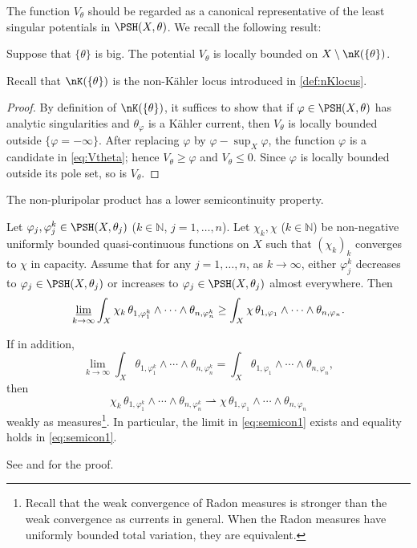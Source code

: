 The function $V_{\theta}$ should be regarded as a canonical representative of the least singular potentials in $\PSH(X,\theta)$. We recall the following result:

\begin{lemma}\label{lma:Vthetalocbdd}
    Suppose that $\{\theta\}$ is big.
    The potential $V_{\theta}$ is locally bounded on $X\setminus \nK(\{\theta\})$.
\end{lemma}
Recall that $\nK(\{\theta\})$ is the non-Kähler locus introduced in \cref{def:nKlocus}.
\begin{proof}
    By definition of $\nK(\{\theta\})$, it suffices to show that if $\varphi\in \PSH(X,\theta)$ has analytic singularities and $\theta_{\varphi}$ is a Kähler current, then $V_{\theta}$ is locally bounded outside $\{\varphi=-\infty\}$. After replacing $\varphi$ by $\varphi-\sup_X\varphi$, the function $\varphi$ is a candidate in \eqref{eq:Vtheta}; hence $V_{\theta}\geq \varphi$ and $V_{\theta}\leq 0$. Since $\varphi$ is locally bounded outside its pole set, so is $V_{\theta}$.
\end{proof}


The non-pluripolar product has a lower semicontinuity property.
\begin{theorem}\label{thm:semicon}
    Let $\varphi_j, \varphi_j^k\in \PSH(X,\theta_j)$ ($k\in \mathbb{N}$, $j=1,\ldots,n$).
    Let $\chi_k,\chi$ ($k\in \mathbb{N}$) be non-negative uniformly bounded quasi-continuous functions on $X$ such that $(\chi_k)_k$ converges to $\chi$ in capacity.
    Assume that for any $j=1,\ldots,n$, as $k\to\infty$, either $\varphi_j^k$ decreases to $\varphi_j\in \PSH(X,\theta_j)$ or increases to $\varphi_j\in \PSH(X,\theta_j)$ almost everywhere.
    Then
    \begin{equation}\label{eq:semicon1}
    \varliminf_{k\to\infty}\int_X\chi_k \,\theta_{1,\varphi_1^k}\wedge \cdots \wedge \theta_{n,\varphi_n^k} \geq \int_X \chi \,\theta_{1,\varphi_1}\wedge \cdots \wedge \theta_{n,\varphi_n}.
\end{equation}

If in addition,
\[
\lim_{k\to\infty}\int_X\theta_{1,\varphi_1^k}\wedge \cdots \wedge \theta_{n,\varphi_n^k} =\int_X \theta_{1,\varphi_1}\wedge \cdots \wedge \theta_{n,\varphi_n},
\]
then
\[
\chi_k \,\theta_{1,\varphi_1^k}\wedge \cdots \wedge \theta_{n,\varphi_n^k}\rightharpoonup \chi \,\theta_{1,\varphi_1}\wedge \cdots \wedge \theta_{n,\varphi_n}
\]
weakly as measures\footnote{Recall that the weak convergence of Radon measures is stronger than the weak convergence as currents in general. When the Radon measures have uniformly bounded total variation, they are equivalent.}. In particular, the limit in \eqref{eq:semicon1} exists and equality holds in \eqref{eq:semicon1}.
\end{theorem}
See \cite[Theorem~2.6]{DDNLsurv} and \cite[Corollary~15.6.8]{FPT} for the proof.

